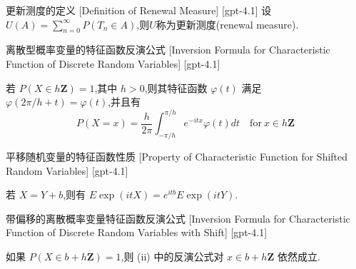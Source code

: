 \documentclass[UTF8]{ctexart}
\begin{document}
    
    
    \begin{dfn}
        {更新测度的定义}
        [Definition of Renewal Measure]
        [gpt-4.1]
        设 $U(A) = \sum_{n=0}^{\infty} P(T_{n} \in A)$,则$U$称为更新测度(renewal measure).
    \end{dfn}
    
    
    
    \begin{thm}
        {离散型概率变量的特征函数反演公式}
        [Inversion Formula for Characteristic Function of Discrete Random Variables]
        [gpt-4.1]
        
若 $P(X \in h \mathbf{Z}) = 1$,其中 $h > 0$,则其特征函数 $\varphi(t)$ 满足 $\varphi(2\pi/h + t) = \varphi(t)$,并且有
\[
P(X = x) = \frac{h}{2\pi} \int_{-\pi/h}^{\pi/h} e^{-i t x} \varphi(t) d t \quad \mathrm{for~} x \in h \mathbf{Z}
\]

    \end{thm}
    
    
    
    \begin{thm}
        {平移随机变量的特征函数性质}
        [Property of Characteristic Function for Shifted Random Variables]
        [gpt-4.1]
        
若 $X = Y + b$,则有 $E \exp(i t X) = e^{i t b} E \exp(i t Y)$.

    \end{thm}
    
    
    
    \begin{thm}
        {带偏移的离散概率变量特征函数反演公式}
        [Inversion Formula for Characteristic Function of Discrete Random Variables with Shift]
        [gpt-4.1]
        
如果 $P(X \in b + h \mathbf{Z}) = 1$,则 (ii) 中的反演公式对 $x \in b + h \mathbf{Z}$ 依然成立.

    \end{thm}
    
    
    
\end{document}
